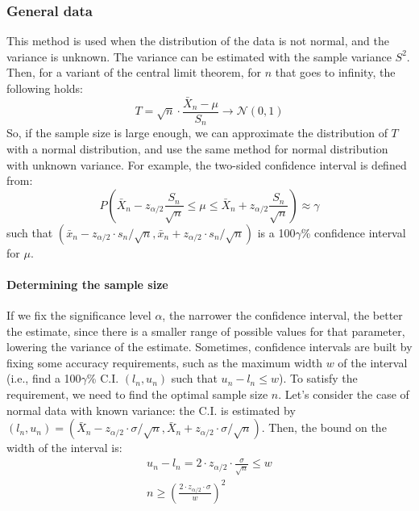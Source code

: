 \subsubsection{General data}

This method is used when the distribution of the data is not normal, and the variance is unknown. The variance can be estimated with the sample variance $S^2$. Then, for a variant of the central limit theorem, for $n$ that goes to infinity, the following holds:
\begin{equation*}
    T = \sqrt{n} \cdot \frac{\bar{X}_n - \mu}{S_n} \to \mathcal{N}(0,1)
\end{equation*}
So, if the sample size is large enough, we can approximate the distribution of $T$ with a normal distribution, and use the same method for normal distribution with unknown variance. For example, the two-sided confidence interval is defined from:
\begin{equation*}
    P(\bar{X}_n - z_{\alpha/2} \frac{S_n}{\sqrt{n}} \leq \mu \leq \bar{X}_n + z_{\alpha/2} \frac{S_n}{\sqrt{n}}) \approx \gamma
\end{equation*}
such that $(\bar{x}_n - z_{\alpha/2} \cdot s_n/\sqrt{n}, \bar{x}_n + z_{\alpha/2} \cdot s_n/\sqrt{n})$ is a 100$\gamma$\% confidence interval for $\mu$.

\paragraph{Determining the sample size}
If we fix the significance level $\alpha$, the narrower the confidence interval, the better the estimate, since there is a smaller range of possible values for that parameter, lowering the variance of the estimate. Sometimes, confidence intervals are built by fixing some accuracy requirements, such as the maximum width $w$ of the interval (i.e., find a 100$\gamma$\% C.I. $(l_n, u_n)$ such that $u_n - l_n \leq w$). To satisfy the requirement, we need to find the optimal sample size $n$. Let's consider the case of normal data with known variance: the C.I. is estimated by $(l_n, u_n) = (\bar{X}_n - z_{\alpha/2} \cdot \sigma/\sqrt{n}, \bar{X}_n + z_{\alpha/2} \cdot \sigma/\sqrt{n})$. Then, the bound on the width of the interval is:
\begin{gather*}
    u_n - l_n = 2 \cdot z_{\alpha/2} \cdot \frac{\sigma}{\sqrt{n}} \leq w \\
    n \geq \left(\frac{2 \cdot z_{\alpha/2} \cdot \sigma}{w}\right)^2
\end{gather*}

